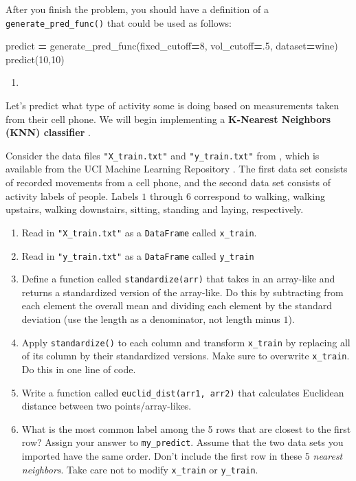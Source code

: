 \documentclass[12pt,krantz2]{krantz}
\makeatletter
\newenvironment{Shaded}{\begin{snugshade}}{\end{snugshade}}
\newcommand{\DecValTok}[1]{\textcolor[rgb]{0.06,0.06,0.06}{#1}}
\newcommand{\NormalTok}[1]{#1}
\newcommand{\OperatorTok}[1]{\textcolor[rgb]{0.43,0.43,0.43}{\textbf{#1}}}
\providecommand{\tightlist}{%
  \setlength{\itemsep}{0pt}\setlength{\parskip}{0pt}}
\newenvironment{kframe}{%
\medskip{}
\setlength{\fboxsep}{.8em}
 \def\at@end@of@kframe{}%
 \ifinner\ifhmode%
  \def\at@end@of@kframe{\end{minipage}}%
  \begin{minipage}{\columnwidth}%
 \fi\fi%
 \def\FrameCommand##1{\hskip\@totalleftmargin \hskip-\fboxsep
 \colorbox{shadecolor}{##1}\hskip-\fboxsep
     \hskip-\linewidth \hskip-\@totalleftmargin \hskip\columnwidth}%
 \MakeFramed {\advance\hsize-\width
   \@totalleftmargin\z@ \linewidth\hsize
   \@setminipage}}%
 {\par\unskip\endMakeFramed%
 \at@end@of@kframe}
\renewenvironment{Shaded}{\begin{kframe}}{\end{kframe}}
\makeatother
\begin{document}
After you finish the problem, you should have a definition of a \texttt{generate\_pred\_func()} that could be used as follows:

\begin{Shaded}
\begin{Highlighting}[]
\NormalTok{predict }\OperatorTok{=}\NormalTok{ generate_pred_func(fixed_cutoff}\OperatorTok{=}\DecValTok{8}\NormalTok{, vol_cutoff}\OperatorTok{=}\NormalTok{.}\DecValTok{5}\NormalTok{, dataset}\OperatorTok{=}\NormalTok{wine)}
\NormalTok{predict(}\DecValTok{10}\NormalTok{,}\DecValTok{10}\NormalTok{)}
\end{Highlighting}
\end{Shaded}

\begin{enumerate}
\def\labelenumi{\arabic{enumi}.}
\setcounter{enumi}{2}
\item
\end{enumerate}

Let's predict what type of activity some is doing based on measurements taken from their cell phone. We will begin implementing a \textbf{K-Nearest Neighbors (KNN) classifier} \citep{knn1} \citep{knn2}.

Consider the data files \texttt{"X\_train.txt"} and \texttt{"y\_train.txt"} from \citep{Anguita2013APD}, which is available from the UCI Machine Learning Repository \citep{uci_data}. The first data set consists of recorded movements from a cell phone, and the second data set consists of activity labels of people. Labels \(1\) through \(6\) correspond to walking, walking upstairs, walking downstairs, sitting, standing and laying, respectively.

\begin{enumerate}
\def\labelenumi{\alph{enumi})}
\tightlist
\item
  Read in \texttt{"X\_train.txt"} as a \texttt{DataFrame} called \texttt{x\_train}.
\item
  Read in \texttt{"y\_train.txt"} as a \texttt{DataFrame} called \texttt{y\_train}
\item
  Define a function called \texttt{standardize(arr)} that takes in an array-like and returns a standardized version of the array-like. Do this by subtracting from each element the overall mean and dividing each element by the standard deviation (use the length as a denominator, not length minus \(1\)).
\item
  Apply \texttt{standardize()} to each column and transform \texttt{x\_train} by replacing all of its column by their standardized versions. Make sure to overwrite \texttt{x\_train}. Do this in one line of code.
\item
  Write a function called \texttt{euclid\_dist(arr1,\ arr2)} that calculates Euclidean distance between two points/array-likes.
\item
  What is the most common label among the 5 rows that are closest to the first row? Assign your answer to \texttt{my\_predict}. Assume that the two data sets you imported have the same order. Don't include the first row in these \(5\) \emph{nearest neighbors}. Take care not to modify \texttt{x\_train} or \texttt{y\_train}.
\end{enumerate}
\end{document}
